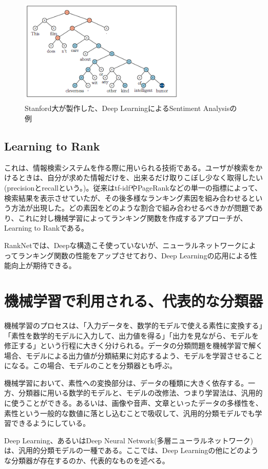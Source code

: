\begin{figure}[tbp]
 \centering
  \includegraphics[width=80mm]{img/c2/rntn_ex}
 \caption{Stanford大が製作した、Deep LearningによるSentiment Analysisの例}
 \label{c2_rntn_ex}
\end{figure}

\subsection{Learning to Rank}
これは、情報検索システムを作る際に用いられる技術である。ユーザが検索をかけるときは、自分が求めた情報だけを、出来るだけ取りこぼし少なく取得したい(precisionとrecallという。\cite{tsujii1999joho})。従来はtf-idfやPageRank\cite{brin1998anatomy}\cite{page1999pagerank}などの単一の指標によって、検索結果を表示させていたが、その後多様なランキング素因を組み合わせるという方法が出現した。どの素因をどのような割合で組み合わせるべきかが問題であり、これに対し機械学習によってランキング関数を作成するアプローチが、Learning to Rankである。\par
RankNet\cite{burges2005learning}では、Deepな構造こそ使っていないが、ニューラルネットワークによってランキング関数の性能をアップさせており、Deep Learningの応用による性能向上が期待できる。

\section{機械学習で利用される、代表的な分類器}
機械学習のプロセスは、「入力データを、数学的モデルで使える素性に変換する」「素性を数学的モデルに入力して、出力値を得る」「出力を見ながら、モデルを修正する」という行程に大きく分けられる。データの分類問題を機械学習で解く場合、モデルによる出力値が分類結果に対応するよう、モデルを学習させることになる。この場合、モデルのことを分類器とも呼ぶ。\par
機械学習において、素性への変換部分は、データの種類に大きく依存する。一方、分類器に用いる数学的モデルと、モデルの改修法、つまり学習法は、汎用的に使うことができる。あるいは、画像や音声、文章といったデータの多様性を、素性という一般的な数値に落とし込むことで吸収して、汎用的分類モデルでも学習できるようにしている。\par
Deep Learning、あるいはDeep Neural Network(多層ニューラルネットワーク)は、汎用的分類モデルの一種である。ここでは、Deep Learningの他にどのような分類器が存在するのか、代表的なものを述べる。

